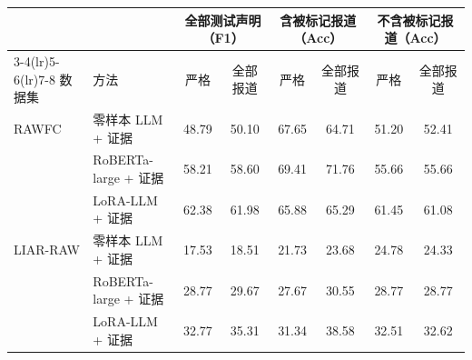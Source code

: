 \begin{tabular}{llcccccc}
\toprule
 & & \multicolumn{2}{c}{全部测试声明（F1）} & \multicolumn{2}{c}{含被标记报道（Acc）} & \multicolumn{2}{c}{不含被标记报道（Acc）} \\
\cmidrule(lr){3-4}\cmidrule(lr){5-6}\cmidrule(lr){7-8}
数据集 & 方法 & 严格 & 全部报道 & 严格 & 全部报道 & 严格 & 全部报道 \\
\midrule
RAWFC & 零样本 LLM + 证据 & 48.79 & 50.10 & 67.65 & 64.71 & 51.20 & 52.41 \\
 & RoBERTa-large + 证据 & 58.21 & 58.60 & 69.41 & 71.76 & 55.66 & 55.66 \\
 & LoRA-LLM + 证据 & 62.38 & 61.98 & 65.88 & 65.29 & 61.45 & 61.08 \\
\midrule
LIAR-RAW & 零样本 LLM + 证据 & 17.53 & 18.51 & 21.73 & 23.68 & 24.78 & 24.33 \\
 & RoBERTa-large + 证据 & 28.77 & 29.67 & 27.67 & 30.55 & 28.77 & 28.77 \\
 & LoRA-LLM + 证据 & 32.77 & 35.31 & 31.34 & 38.58 & 32.51 & 32.62 \\
\bottomrule
\end{tabular}
